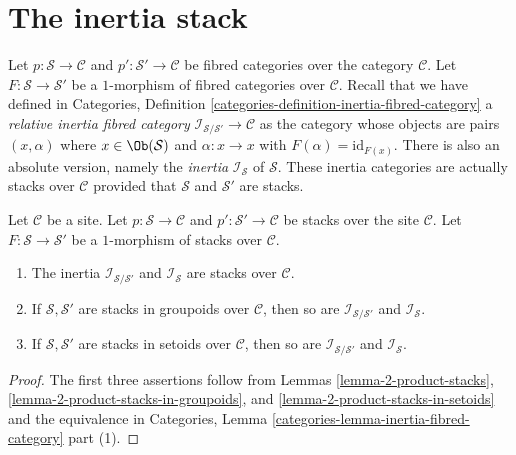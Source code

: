 \section{The inertia stack}
\label{section-the-inertia-stack}

\noindent
Let
$p : \mathcal{S} \to \mathcal{C}$ and
$p' : \mathcal{S}' \to \mathcal{C}$
be fibred categories over the category $\mathcal{C}$.
Let $F : \mathcal{S} \to \mathcal{S}'$ be a $1$-morphism of
fibred categories over $\mathcal{C}$.
Recall that we have defined in
Categories, Definition \ref{categories-definition-inertia-fibred-category}
a {\it relative inertia fibred category}
$\mathcal{I}_{\mathcal{S}/\mathcal{S}'} \to \mathcal{C}$ as the
category whose objects are pairs $(x , \alpha)$ where
$x \in \Ob(\mathcal{S})$ and $\alpha : x \to x$ with
$F(\alpha) = \text{id}_{F(x)}$. There is also an absolute version,
namely the {\it inertia} $\mathcal{I}_\mathcal{S}$ of $\mathcal{S}$.
These inertia categories are actually stacks over $\mathcal{C}$ provided
that $\mathcal{S}$ and $\mathcal{S}'$ are stacks.

\begin{lemma}
\label{lemma-inertia}
Let $\mathcal{C}$ be a site. Let
$p : \mathcal{S} \to \mathcal{C}$ and
$p' : \mathcal{S}' \to \mathcal{C}$
be stacks over the site $\mathcal{C}$.
Let $F : \mathcal{S} \to \mathcal{S}'$ be a $1$-morphism of
stacks over $\mathcal{C}$.
\begin{enumerate}
\item The inertia $\mathcal{I}_{\mathcal{S}/\mathcal{S}'}$ and
$\mathcal{I}_\mathcal{S}$ are stacks over $\mathcal{C}$.
\item If $\mathcal{S}, \mathcal{S}'$ are stacks in groupoids over
$\mathcal{C}$, then so are $\mathcal{I}_{\mathcal{S}/\mathcal{S}'}$ and
$\mathcal{I}_\mathcal{S}$.
\item If $\mathcal{S}, \mathcal{S}'$ are stacks in setoids over $\mathcal{C}$,
then so are $\mathcal{I}_{\mathcal{S}/\mathcal{S}'}$ and
$\mathcal{I}_\mathcal{S}$.
\end{enumerate}
\end{lemma}

\begin{proof}
The first three assertions follow from
Lemmas \ref{lemma-2-product-stacks},
\ref{lemma-2-product-stacks-in-groupoids}, and
\ref{lemma-2-product-stacks-in-setoids}
and the equivalence in
Categories, Lemma \ref{categories-lemma-inertia-fibred-category} part (1).
\end{proof}

